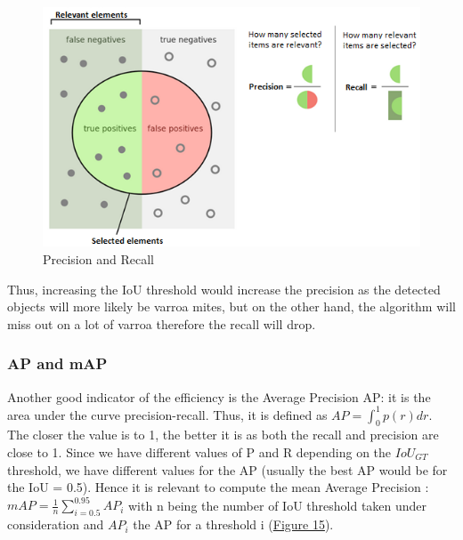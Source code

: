 \documentclass{article}
\begin{document}
\begin{figure}[!ht]
  \centering
  \includegraphics[scale=0.65]{metrics/precisionrecall.png}
  \caption{Precision and Recall ~\cite{precision}}
  \label{Figure 14}
\end{figure}

\bigskip

Thus, increasing the IoU threshold would increase the precision as the detected objects will more likely be varroa mites, but on the other hand, the algorithm will miss out on a lot of varroa therefore the recall will drop.

\bigskip
\bigskip

\subsubsection{AP and mAP}

Another good indicator of the efficiency is  the Average Precision AP: it is the area under the curve precision-recall. Thus, it is defined as $AP = \int_{0}^{1} p(r) dr$. The closer the value is to 1, the better it is as both the recall and precision are close to 1. Since we have different values of P and R depending on the $IoU_{GT}$ threshold, we have different values for the AP (usually the best AP would be for the IoU = 0.5). Hence it is relevant to compute the mean Average Precision : $mAP = \frac{1}{n} \sum_{i = 0.5}^{0.95} AP_i$ with n being the number of IoU threshold taken under consideration and $AP_i$ the AP for a threshold i (\hyperref[Figure 15]{Figure 15}). 
\end{document}

